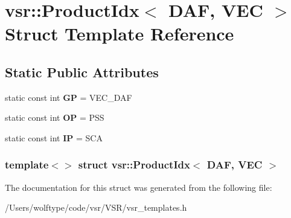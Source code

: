 \hypertarget{structvsr_1_1_product_idx_3_01_d_a_f_00_01_v_e_c_01_4}{\section{vsr\-:\-:Product\-Idx$<$ D\-A\-F, V\-E\-C $>$ Struct Template Reference}
\label{structvsr_1_1_product_idx_3_01_d_a_f_00_01_v_e_c_01_4}
}
\subsection*{Static Public Attributes}
\begin{DoxyCompactItemize}
\item 
\hypertarget{structvsr_1_1_product_idx_3_01_d_a_f_00_01_v_e_c_01_4_a42fe4f941ab7fd774e5b1eec28ce25b3}{static const int {\bfseries G\-P} = V\-E\-C\-\_\-\-D\-A\-F}\label{structvsr_1_1_product_idx_3_01_d_a_f_00_01_v_e_c_01_4_a42fe4f941ab7fd774e5b1eec28ce25b3}

\item 
\hypertarget{structvsr_1_1_product_idx_3_01_d_a_f_00_01_v_e_c_01_4_af1eb97401a60912d8e2ff79223195111}{static const int {\bfseries O\-P} = P\-S\-S}\label{structvsr_1_1_product_idx_3_01_d_a_f_00_01_v_e_c_01_4_af1eb97401a60912d8e2ff79223195111}

\item 
\hypertarget{structvsr_1_1_product_idx_3_01_d_a_f_00_01_v_e_c_01_4_aa65414d5e3e68d570e986aa5f846ed44}{static const int {\bfseries I\-P} = S\-C\-A}\label{structvsr_1_1_product_idx_3_01_d_a_f_00_01_v_e_c_01_4_aa65414d5e3e68d570e986aa5f846ed44}

\end{DoxyCompactItemize}
\subsubsection*{template$<$$>$ struct vsr\-::\-Product\-Idx$<$ D\-A\-F, V\-E\-C $>$}



The documentation for this struct was generated from the following file\-:\begin{DoxyCompactItemize}
\item 
/\-Users/wolftype/code/vsr/\-V\-S\-R/vsr\-\_\-templates.\-h\end{DoxyCompactItemize}
